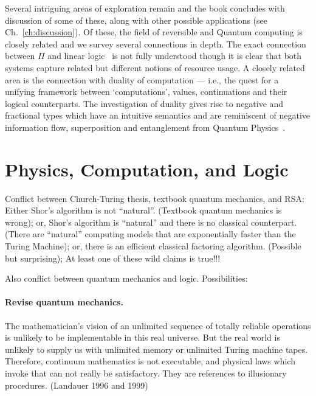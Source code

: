 \documentclass{article}
\begin{document}
Several intriguing areas of exploration remain and the book concludes
with discussion of some of these, along with other possible
applications (see Ch.~\ref{ch:discussion}).  Of these, the field of
reversible and Quantum computing is closely related and we survey
several connections in depth.  The exact connection between $\Pi$ and
linear logic~\cite{Girard87tcs} is not fully understood though it is
clear that both systems capture related but different notions of
resource usage. A closely related area is the connection with duality
of computation \cite{Filinski:89, DBLP:conf/icfp/CurienH00,
  10.1109/LICS.2010.23,Wadler:2003} --- i.e., the quest for a unifying
framework between `computations', values, continuations and their
logical counterparts. The investigation of duality gives rise to
negative and fractional types which have an intuitive semantics and
are reminiscent of negative information flow, superposition and
entanglement from Quantum Physics~\cite{piee}.

\section{Physics, Computation, and Logic}

Conflict between Church-Turing thesis, textbook quantum mechanics, and
RSA: Either Shor's algorithm is not ``natural''. (Textbook quantum
mechanics is wrong); or, Shor's algorithm is ``natural'' and there is
no classical counterpart. (There are ``natural'' computing models that
are exponentially faster than the Turing Machine); or, there is an
efficient classical factoring algorithm. (Possible but surprising); At
least one of these wild claims is true!!!

\noindent Also conflict between quantum mechanics and logic. Possibilities:

\paragraph*{Revise quantum mechanics.}

The mathematician's vision of an unlimited sequence of totally
reliable operations is unlikely to be implementable in this real
universe.  But the real world is unlikely to supply us with unlimited
memory or unlimited Turing machine tapes. Therefore, continuum
mathematics is not executable, and physical laws which invoke that can
not really be satisfactory. They are references to illusionary
procedures.  (Landauer 1996 and 1999)
\end{document}
